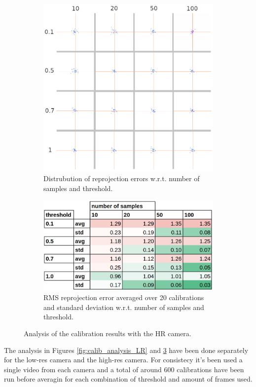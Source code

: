 \begin{figure}[H]
  \centering
  \begin{subfigure}{.5\textwidth}
    \centering
    \includegraphics[width=.8\linewidth]{figures/reprj_dist_HR.png}
    \caption{Distrubution of reprojection errors w.r.t. \newline number of samples and threshold.}
    \label{fig:reprj_dist_HR}
  \end{subfigure}%
  \begin{subfigure}{.5\textwidth}
    \centering
    \includegraphics[width=0.8\linewidth]{figures/calib_results_table_HR.png}
    \caption{RMS reprojection error averaged over 20 calibrations and standard deviation w.r.t. number of samples and threshold.}
    \label{fig:calib_stats_HR}
  \end{subfigure}
  \caption{Analysis of the calibration results with the HR camera.}
  \label{fig:calib_analysis_HR}
\end{figure}
The analysis in Figures \ref{fig:calib_analysis_LR} and \ref{fig:calib_analysis_HR} have been done separately for the low-res camera and the high-res camera. For consistecy it's been used a single video from each camera and a total of around 600 calibrations have been run before averagin for each combination of threshold and amount of frames used.

